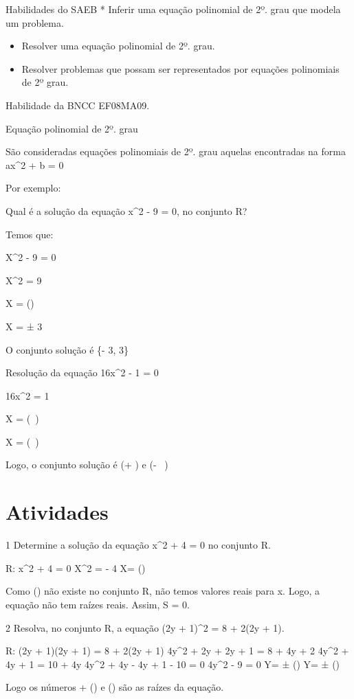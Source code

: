 {Habilidades do SAEB * Inferir uma equação polinomial de 2º. grau que
modela um problema.

\begin{itemize}
\item
  Resolver uma equação polinomial de 2º. grau.
\item
  Resolver problemas que possam ser representados por equações
  polinomiais de 2º grau.
\end{itemize}

Habilidade da BNCC EF08MA09.

Equação polinomial de 2º. grau

São consideradas equações polinomiais de 2º. grau aquelas encontradas na
forma ax^2 + b = 0

Por exemplo:

Qual é a solução da equação x^2 - 9 = 0, no conjunto R?

Temos que:

X^2 - 9 = 0

X^2 = 9

X = ()

X = ± 3

O conjunto solução é \{- 3, 3\}

Resolução da equação 16x^2 - 1 = 0

16x^2 = 1

X = (\  \pm {})

X = (\  \pm {})

Logo, o conjunto solução é (+ ) e (- \ )

\section{Atividades}

\num{1} Determine a solução da equação x^2 + 4 = 0 no conjunto R.

R: x^2 + 4 = 0
X^2 = - 4
X= ()

Como () não existe no conjunto R, não temos valores reais
para x. Logo, a equação não tem raízes reais. Assim, S = 0.

\num{2} Resolva, no conjunto R, a equação (2y + 1)^2 = 8 + 2(2y + 1).

R: (2y + 1)(2y + 1) = 8 + 2(2y + 1)
4y^2 + 2y + 2y + 1 = 8 + 4y + 2
4y^2 + 4y + 1 = 10 + 4y
4y^2 + 4y - 4y + 1 - 10 = 0
4y^2 - 9 = 0
Y= ± ()
Y= ± ()

Logo os números + () e () são as raízes da
equação.

}

